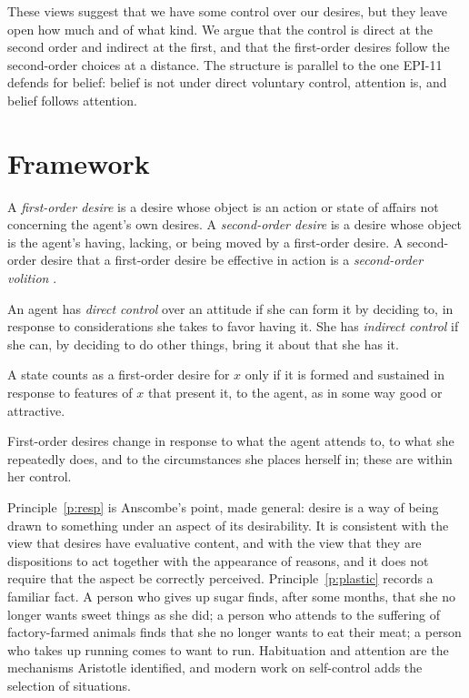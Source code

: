 \documentclass{situationist-preprint}
\begin{document}
These views suggest that we have some control over our desires, but they leave open how much and of what kind. We argue that the control is direct at the second order and indirect at the first, and that the first-order desires follow the second-order choices at a distance. The structure is parallel to the one EPI-11 defends for belief: belief is not under direct voluntary control, attention is, and belief follows attention.

\section{Framework}

\begin{definition}\label{d:orders}
A \emph{first-order desire} is a desire whose object is an action or state of affairs not concerning the agent's own desires. A \emph{second-order desire} is a desire whose object is the agent's having, lacking, or being moved by a first-order desire. A second-order desire that a first-order desire be effective in action is a \emph{second-order volition} \citep{Frankfurt1971}.
\end{definition}

\begin{definition}\label{d:control}
An agent has \emph{direct control} over an attitude if she can form it by deciding to, in response to considerations she takes to favor having it. She has \emph{indirect control} if she can, by deciding to do other things, bring it about that she has it.
\end{definition}

\begin{principle}\label{p:resp}
A state counts as a first-order desire for $x$ only if it is formed and sustained in response to features of $x$ that present it, to the agent, as in some way good or attractive.
\end{principle}

\begin{principle}[Plasticity]\label{p:plastic}
First-order desires change in response to what the agent attends to, to what she repeatedly does, and to the circumstances she places herself in; these are within her control.
\end{principle}

Principle~\ref{p:resp} is Anscombe's point, made general: desire is a way of being drawn to something under an aspect of its desirability. It is consistent with the view that desires have evaluative content, and with the view that they are dispositions to act together with the appearance of reasons, and it does not require that the aspect be correctly perceived. Principle~\ref{p:plastic} records a familiar fact. A person who gives up sugar finds, after some months, that she no longer wants sweet things as she did; a person who attends to the suffering of factory-farmed animals finds that she no longer wants to eat their meat; a person who takes up running comes to want to run. Habituation and attention are the mechanisms Aristotle identified, and modern work on self-control adds the selection of situations.
\end{document}
